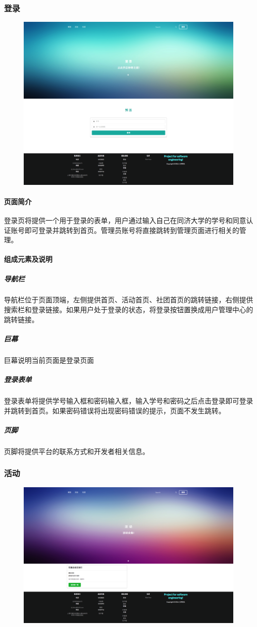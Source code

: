 \documentclass[UTF8]{ctexart}
\begin{document}
\subsubsection{登录}
\begin{figure}[H]
\centering
\includegraphics[width = .9\textwidth]{web-login.png}
\end{figure}
\paragraph{页面简介}
登录页将提供一个用于登录的表单，用户通过输入自己在同济大学的学号和同意认证账号即可登录并跳转到首页。管理员账号将直接跳转到管理页面进行相关的管理。

\paragraph{组成元素及说明}
\subparagraph*{导航栏}
导航栏位于页面顶端，左侧提供首页、活动首页、社团首页的跳转链接，右侧提供搜索栏和登录链接。如果用户处于登录的状态，将登录按钮置换成用户管理中心的跳转链接。
\subparagraph*{巨幕}
巨幕说明当前页面是登录页面
\subparagraph*{登录表单}
登录表单将提供学号输入框和密码输入框，输入学号和密码之后点击登录即可登录并跳转到首页。如果密码错误将出现密码错误的提示，页面不发生跳转。
\subparagraph*{页脚}
页脚将提供平台的联系方式和开发者相关信息。

\subsubsection{活动}
\begin{figure}[H]
\centering
\includegraphics[width = .9\textwidth]{web-activity-home.png}
\end{figure}
\end{document}
